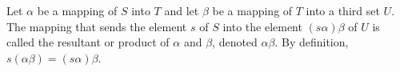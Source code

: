 Let $\alpha$ be a mapping of $S$ into $T$ and let $\beta$ be a mapping of $T$ into a third set $U$. The mapping that sends the element $s$ of $S$ into the element $(s\alpha)\beta$ of $U$ is called the resultant or product of $\alpha$ and $\beta$, denoted $\alpha\beta$. By definition, $s(\alpha\beta) = (s\alpha)\beta$.

